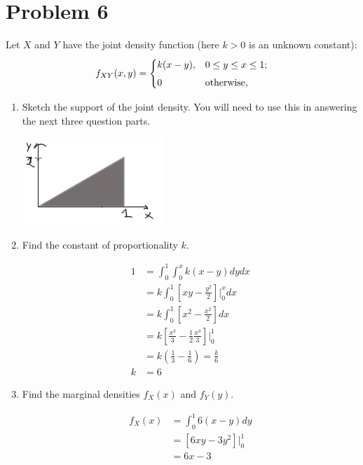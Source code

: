 \documentclass{article}
\newcommand{\1}{\mathbf{1}}
\begin{document}
\newpage
\section*{Problem 6}  Let $X$ and $Y$ have the joint density function (here $k>0$ is an unknown constant):
$$ f_{XY}(x,y) = \begin{cases}
    k(x-y), & 0\leq y\leq x \leq 1;\\[4pt]
    0 & \hbox{otherwise,}
\end{cases}$$

\begin{enumerate}
    \item Sketch the support of the joint density. You will need to use this in answering the next three question parts.
    
    \begin{center}
    \includegraphics[width=200px]{STATS509/HW4/HW4Figures/picasso4.png}
    \end{center}

    \item Find the constant of proportionality $k$.
    
    \begin{align*}
    1 &= \int_0^1\int_0^x k(x-y)dydx\\
      &= k \int_0^1 \left[xy - \frac{y^2}{2}\right]\bigg |_0^x dx \\
      &= k \int_0^1 \left[x^2 - \frac{x^2}{2}\right] dx \\
      &= k \left[ \frac{x^3}{3} - \frac{1}{2}\frac{x^3}{3} \right] \bigg |_0^1 \\
      &= k \left( \frac{1}{3} - \frac{1}{6}\right) = \frac{k}{6}\\
    k &= 6
    \end{align*}

    \item Find the marginal densities $f_X(x)$ and $f_Y(y)$.
    
    \begin{align*}
    f_X(x) &= \int_0^1 6(x-y) dy \\
    &= \left[6xy - 3y^2\right]\bigg|_0^1 \\
    &= 6x-3
    \end{align*}
    

\end{enumerate}
\end{document}
